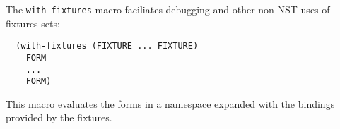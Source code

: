 % 
% 
% 

The \texttt{with-fixtures} macro faciliates debugging and other
non-NST uses of fixtures sets:
\begin{verbatim}
  (with-fixtures (FIXTURE ... FIXTURE)
    FORM
    ...
    FORM)
\end{verbatim}
This macro evaluates the forms in a namespace expanded with the
bindings provided by the fixtures.


